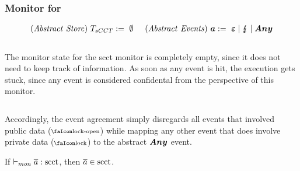 \documentclass[utf8,acmsmall,review,screen,dvipsnames,anonymous]{acmart}
\begin{document}
\subsubsection{Monitor for }
\begin{gather*}
  \begin{aligned}
    \mathit{(Abstract\ Store)}~T_{sCCT}{}&:=\ \emptyset \hspace{0.5cm}
    \mathit{(Abstract\ Events)}~\bm{a}:=\ \bm{\varepsilon} \mid \lightning{\kern-5.5pt}\lightning \mid \bm{Any} \\
  \end{aligned}
\end{gather*}
\begin{center}
  $\;$\\
\end{center}
The monitor state for the \gls*{scct} monitor is completely empty, since it does not need to keep track of information.
As soon as any event is hit, the execution gets stuck, since any event is considered confidental from the perspective of this monitor.
\begin{center}
  $\;$\\
\end{center}
Accordingly, the event agreement simply disregards all events that involved public data ($\unlock$) while mapping any other event that does involve private data ($\lock$) to the abstract $\bm{Any}$ event.

\begin{lemma}\label{lem:mon:scctsafe}
  If $\vdash_{mon}{\overline{a}}:{\operatorname{scct}}$, then $\overline{a}\in\operatorname{scct}$. %
\end{lemma}
\end{document}
